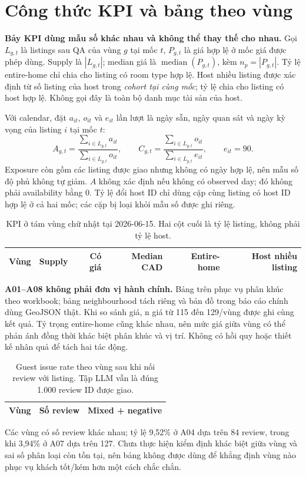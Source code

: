 \documentclass[11pt,a4paper]{article}
\begin{document}
\clearpage
\section{Công thức KPI và bảng theo vùng}
\textbf{Bảy KPI dùng mẫu số khác nhau và không thể thay thế cho nhau.} Gọi $L_{g,t}$ là listings sau QA của vùng $g$ tại mốc $t$, $P_{g,t}$ là giá hợp lệ ở mốc giá được phép dùng. Supply là $|L_{g,t}|$; median giá là $\operatorname{median}(P_{g,t})$, kèm $n_p=|P_{g,t}|$. Tỷ lệ entire-home chỉ chia cho listing có room type hợp lệ. Host nhiều listing được xác định từ số listing của host trong \emph{cohort tại cùng mốc}; tỷ lệ chia cho listing có host hợp lệ. Không gọi đây là toàn bộ danh mục tài sản của host.

Với calendar, đặt $a_{it}$, $o_{it}$ và $e_{it}$ lần lượt là ngày sẵn, ngày quan sát và ngày kỳ vọng của listing $i$ tại mốc $t$:
\[
A_{g,t}=\frac{\sum_{i\in L_{g,t}}a_{it}}{\sum_{i\in L_{g,t}}o_{it}},\qquad
C_{g,t}=\frac{\sum_{i\in L_{g,t}}o_{it}}{\sum_{i\in L_{g,t}}e_{it}},\qquad e_{it}=90.
\]
Exposure còn gồm các listing được giao nhưng không có ngày hợp lệ, nên mẫu số độ phủ không tự giảm. $A$ không xác định nếu không có observed day; đó không phải availability bằng 0. Tỷ lệ đổi host ID chỉ dùng cặp cùng listing có host ID hợp lệ ở cả hai mốc; các cặp bị loại khỏi mẫu số được ghi riêng.

\begin{table}[htbp]\centering\small
\caption{KPI ở tám vùng chữ nhật tại 2026-06-15. Hai cột cuối là tỷ lệ listing, không phải tỷ lệ host.}
\begin{tabular}{@{}lrrrrr@{}}\toprule
Vùng & Supply & Có giá & Median CAD & Entire-home & Host nhiều listing\\\midrule

\end{tabular}
\end{table}

\textbf{A01--A08 không phải đơn vị hành chính.} Bảng trên phục vụ phân khúc theo workbook; bảng neighbourhood tách riêng và bản đồ trong báo cáo chính dùng GeoJSON thật. Khi so sánh giá, n giá từ 115 đến 129/vùng được ghi cùng kết quả. Tỷ trọng entire-home cũng khác nhau, nên mức giá giữa vùng có thể phản ánh đồng thời khác biệt phân khúc và vị trí. Không có hồi quy hoặc thiết kế nhân quả để tách hai tác động.

\begin{table}[htbp]\centering\small
\caption{Guest issue rate theo vùng sau khi nối review với listing. Tập LLM vẫn là đúng 1.000 review ID được giao.}
\begin{tabular}{@{}lrr@{}}\toprule
Vùng & Số review & Mixed + negative\\\midrule

\end{tabular}
\end{table}
Các vùng có số review khác nhau; tỷ lệ 9,52\% ở A04 dựa trên 84 review, trong khi 3,94\% ở A07 dựa trên 127. Chưa thực hiện kiểm định khác biệt giữa vùng và sai số phân loại còn tồn tại, nên bảng không được dùng để khẳng định vùng nào phục vụ khách tốt/kém hơn một cách chắc chắn.
\end{document}
